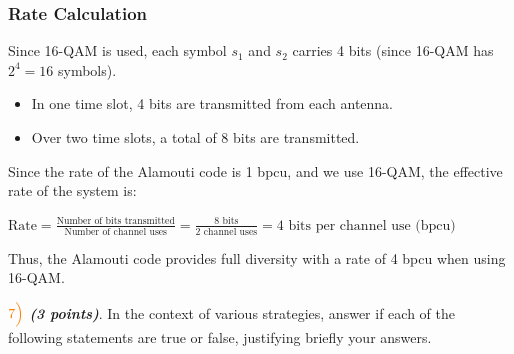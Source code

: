 \documentclass[11pt]{article}
\providecommand{\tightlist}{%
      \setlength{\itemsep}{0pt}\setlength{\parskip}{0pt}}
\begin{document}
\subsubsection{Rate Calculation}\label{rate-calculation}

Since 16-QAM is used, each symbol \(s_1\) and \(s_2\) carries 4 bits
(since 16-QAM has \(2^4 = 16\) symbols).

\begin{itemize}
\tightlist
\item
  In one time slot, 4 bits are transmitted from each antenna.
\item
  Over two time slots, a total of 8 bits are transmitted.
\end{itemize}

Since the rate of the Alamouti code is 1 bpcu, and we use 16-QAM, the
effective rate of the system is:

\(\text{Rate} = \frac{\text{Number of bits transmitted}}{\text{Number of channel uses}} = \frac{8 \text{ bits}}{2 \text{ channel uses}} = 4 \text{ bits per channel use (bpcu)}\)

Thus, the Alamouti code provides full diversity with a rate of 4 bpcu
when using 16-QAM.

    \(\color{orange}7\Bigl)\) \textbf{\emph{(3 points)}}. In the context of
various strategies, answer if each of the following statements are true
or false, justifying briefly your answers.
\end{document}
